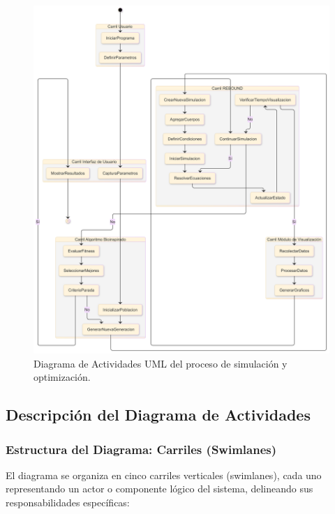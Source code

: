 \begin{figure}[H] %
    \centering
    \includegraphics[width=\textwidth]{img/Analisis/DiagramaActividades.png}
    \caption{Diagrama de Actividades UML del proceso de simulación y optimización.}%
    \label{fig:activity_diagram} %
\end{figure}

\subsection{Descripción del Diagrama de Actividades}

\subsubsection{Estructura del Diagrama: Carriles (Swimlanes)}

El diagrama se organiza en cinco carriles verticales (swimlanes), cada uno representando un actor o componente lógico del sistema, delineando sus responsabilidades específicas:

